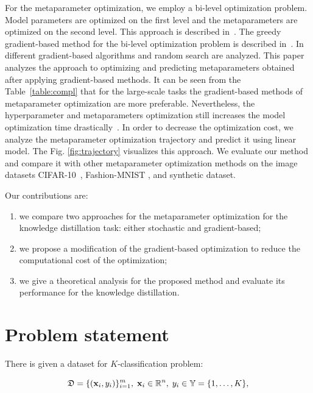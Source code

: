 \documentclass[runningheads]{llncs}
\begin{document}
For the metaparameter optimization, we employ a bi-level optimization problem. Model parameters are optimized on the first level and the metaparameters are optimized on the second level. This approach is described in~\cite{journals/corr/LuketinaBR15,journals/anor/BakhteevS20,journals/corr/MaclaurinDA15}. The greedy gradient-based method  for the bi-level optimization problem is described in~\cite{journals/corr/LuketinaBR15}. In~\cite{journals/anor/BakhteevS20} different gradient-based algorithms and random search are analyzed. 
This paper analyzes the approach to optimizing and predicting metaparameters obtained after applying gradient-based methods. It can be seen from the Table~\ref{table:compl} that for the large-scale tasks the gradient-based methods of metaparameter optimization are more preferable. Nevertheless, the hyperparameter and metaparameters optimization still increases the model optimization time drastically~\cite{liu2018darts}. In order to decrease the optimization cost, we analyze the metaparameter optimization trajectory and predict it using linear model. The Fig. \ref{fig:trajectory} visualizes this approach. We evaluate our method and compare it with other metaparameter optimization methods on the image datasets CIFAR-10~\cite{krizhevsky2009learning}, Fashion-MNIST \cite{journals/corr/abs-1708-07747}, and synthetic dataset. 

Our contributions are:
\begin{enumerate}[{1)}]
    \item we compare two approaches for the metaparameter optimization for the knowledge distillation task: either stochastic and gradient-based;
    
    \item we propose a modification of the gradient-based optimization to reduce the computational cost of the optimization;
    
    \item we give a theoretical analysis for the proposed method and evaluate its performance for the knowledge distillation.
\end{enumerate}


\section{Problem statement}
There is given a dataset for $K$-classification problem:

$$
    \mathfrak{D} = \{(\mathbf{x}_i, y_i)\}_{i=1}^{m},\; \mathbf{x}_i \in \mathbb{R}^n,\; y_i \in \mathbb{Y} = \{1, \dots, K\},
$$
\end{document}
